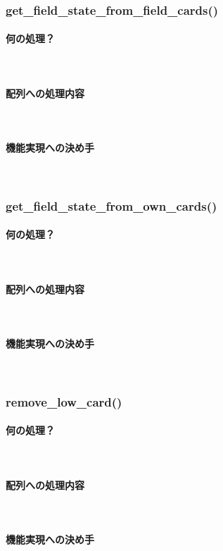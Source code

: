 \documentclass[11pt,a4paper, uplatex]{jsarticle}
\begin{document}
\subsubsection{get\_field\_state\_from\_field\_cards()}
\paragraph{何の処理？}\mbox{}\\
\paragraph{配列への処理内容}\mbox{}\\
\paragraph{機能実現への決め手}\mbox{}\\
%
\subsubsection{get\_field\_state\_from\_own\_cards()}
\paragraph{何の処理？}\mbox{}\\
\paragraph{配列への処理内容}\mbox{}\\
\paragraph{機能実現への決め手}\mbox{}\\
%
\subsubsection{remove\_low\_card()}
\paragraph{何の処理？}\mbox{}\\
\paragraph{配列への処理内容}\mbox{}\\
\paragraph{機能実現への決め手}\mbox{}\\
%
\end{document}
